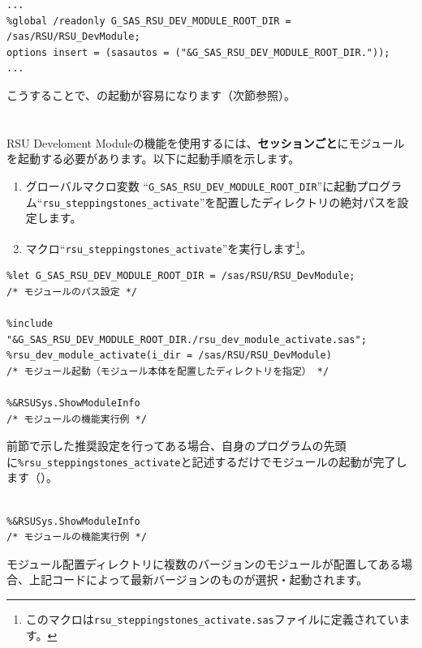 \begin{lstlisting}[language=SAS, caption={\texttt{appserver\_autoexec\_usermods.sas}における設定内容例}, label={code:sasautos}, breaklines = true]
...
%global /readonly G_SAS_RSU_DEV_MODULE_ROOT_DIR = /sas/RSU/RSU_DevModule;
options insert = (sasautos = ("&G_SAS_RSU_DEV_MODULE_ROOT_DIR."));
...
\end{lstlisting}
 
こうすることで、\RDM の起動が容易になります（次節参照）。
 
\section{\DocStrTitleRDMHowToUse}
RSU Develoment Moduleの機能を使用するには、{\bfseries セッションごと}にモジュールを起動する必要があります。以下に起動手順を示します。
\begin{enumerate}
\item グローバルマクロ変数 ``\texttt{G\_SAS\_RSU\_DEV\_MODULE\_ROOT\_DIR}''に起動プログラム``\texttt{rsu\_steppingstones\_activate}''を配置したディレクトリの絶対パスを設定します。
\item マクロ``\texttt{rsu\_steppingstones\_activate}''を実行します\footnote{このマクロは\texttt{rsu\_steppingstones\_activate.sas}ファイルに定義されています。}。
\end{enumerate}
\begin{lstlisting}[language=SAS, caption={RSU Stepping Stones 使用例}, label={code:activation}, breaklines = true]
%global G_SAS_RSU_DEV_MODULE_ROOT_DIR;
%let G_SAS_RSU_DEV_MODULE_ROOT_DIR = /sas/RSU/RSU_DevModule;					/* モジュールのパス設定 */
 
%include "&G_SAS_RSU_DEV_MODULE_ROOT_DIR./rsu_dev_module_activate.sas";
%rsu_dev_module_activate(i_dir = /sas/RSU/RSU_DevModule)							/* モジュール起動（モジュール本体を配置したディレクトリを指定） */
 
%&RSUSys.ShowModuleInfo																		/* モジュールの機能実行例 */
\end{lstlisting}
 
前節で示した推奨設定を行ってある場合、自身のプログラムの先頭に\texttt{\%rsu\_steppingstones\_activate}と記述するだけでモジュールの起動が完了します（）。
\begin{lstlisting}[language=SAS, caption={RSU Steppting Stones起動例}, label={code:activation_revised}, breaklines = true]
%rsu_steppginstones_activate													/* モジュール起動（パスの指定不要） */
 
%&RSUSys.ShowModuleInfo															/* モジュールの機能実行例 */
\end{lstlisting}
\begin{marker}
モジュール配置ディレクトリに複数のバージョンのモジュールが配置してある場合、上記コードによって最新バージョンのものが選択・起動されます。
\end{marker}
 
